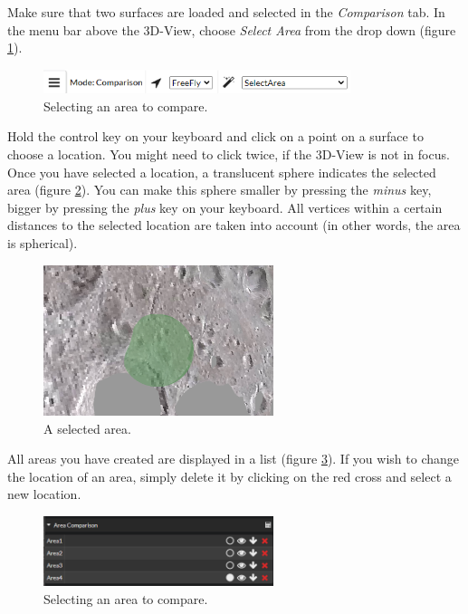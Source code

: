 Make sure that two surfaces are loaded and selected in the \emph{Comparison} tab. In the menu bar above the 3D-View, choose \emph{Select Area} from the drop down (figure \ref{fig:surfaceComparisonAreaSelection}).

\begin{figure}[h]
	\centering
	\includegraphics[width=0.8\textwidth]{pics/surfaceComparisonSelectArea.PNG}
	\caption[Selecting an area to compare.]{Selecting an area to compare.}
	\label{fig:surfaceComparisonAreaSelection}
\end{figure}

Hold the control key on your keyboard and click on a point on a surface to choose a location. You might need to click twice, if the 3D-View is not in focus. Once you have selected a location, a translucent sphere indicates the selected area (figure \ref{fig:surfaceComparisonAreaSphere}). You can make this sphere smaller by pressing the \emph{minus} key, bigger by pressing the \emph{plus} key on your keyboard. All vertices within a certain distances to the selected location are taken into account (in other words, the area is spherical).

\begin{figure}[h]
	\centering
	\includegraphics[width=0.6\textwidth]{pics/surfaceComparisonAreaSphere.PNG}
	\caption[A selected area.]{A selected area.}
	\label{fig:surfaceComparisonAreaSphere}
\end{figure}

All areas you have created are displayed in a list (figure \ref{fig:surfaceComparisonAreaList}). If you wish to change the location of an area, simply delete it by clicking on the red cross and select a new location. 

\begin{figure}[h]
	\centering
	\includegraphics[width=0.6\textwidth]{pics/surfaceComparisonAreaList.PNG}
	\caption[Selecting an area to compare.]{Selecting an area to compare.}
	\label{fig:surfaceComparisonAreaList}
\end{figure}

